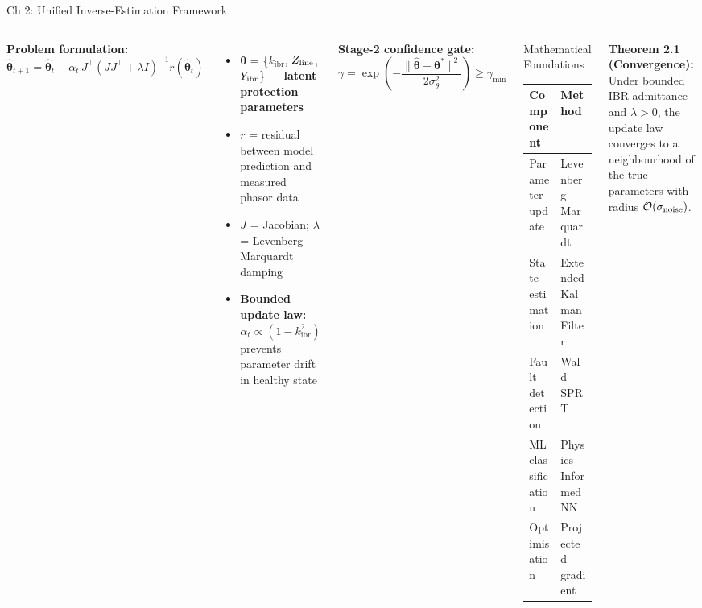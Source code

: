 \documentclass[10pt,aspectratio=169]{beamer}
\newcommand{\kibr}{k_{\mathrm{ibr}}}
\begin{document}
\begin{frame}{Ch 2: Unified Inverse-Estimation Framework}
  \begin{columns}[T]
      \textbf{Problem formulation:}
      \[
        \hat{\boldsymbol{\theta}}_{t+1}
          = \hat{\boldsymbol{\theta}}_t
            - \alpha_t \,J^\top(J J^\top + \lambda I)^{-1}
              r(\hat{\boldsymbol{\theta}}_t)
      \]
      \vspace{-0.2cm}
      \begin{itemize}\itemsep3pt
        \item $\boldsymbol{\theta}$ = \{$\kibr$, $Z_{\rm line}$, $Y_{\rm ibr}$\}
          — \textbf{latent protection parameters}
        \item $r$ = residual between model prediction and
          measured phasor data
        \item $J$ = Jacobian; $\lambda$ = Levenberg–Marquardt damping
        \item \textbf{Bounded update law:} $\alpha_t \propto (1 - \kibr^2)$
          prevents parameter drift in healthy state
      \end{itemize}
      \textbf{Stage-2 confidence gate:}
      \[
        \gamma = \exp\!\left(-\frac{\|\hat{\boldsymbol{\theta}} -
          \boldsymbol{\theta}^*\|^2}{2\sigma_\theta^2}\right) \geq \gamma_{\min}
      \]
      \begin{block}{\small Mathematical Foundations}
        \small
        \begin{tabular}{ll}
          \toprule
          Component & Method\\
          \midrule
          Parameter update & Levenberg–Marquardt\\
          State estimation  & Extended Kalman Filter\\
          Fault detection   & Wald SPRT\\
          ML classification & Physics-Informed NN\\
          Optimisation      & Projected gradient\\
          \bottomrule
        \end{tabular}
      \end{block}
      \vspace{0.3cm}
      \textbf{Theorem 2.1 (Convergence):}\\
      \small Under bounded IBR admittance and
      \(\lambda > 0\), the update law converges to
      a neighbourhood of the true parameters with
      radius \(\mathcal{O}(\sigma_{\rm noise})\).
  \end{columns}
\end{frame}
\end{document}
